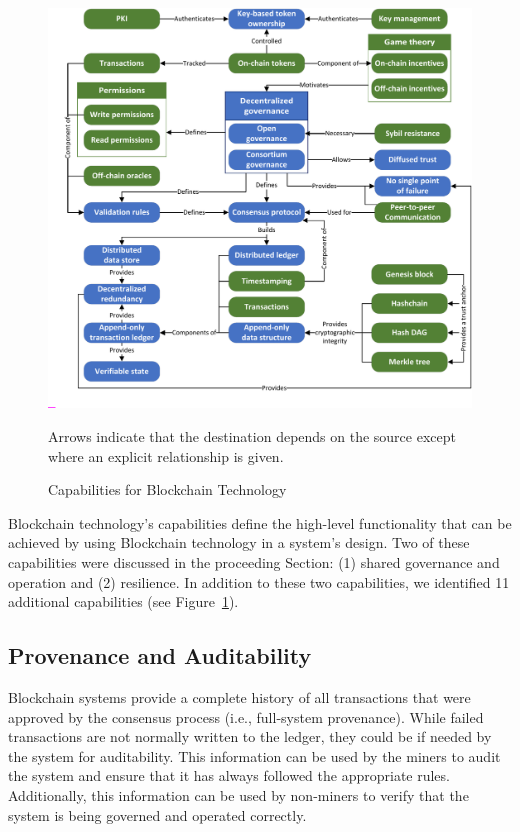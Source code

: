 \begin{figure}
	\centering
	\includegraphics[page=4,width=\columnwidth]{figures/grounded-theory-main}
	
	Arrows indicate that the destination depends on the source except where an explicit relationship is given.
	\caption{Capabilities for Blockchain Technology}
	\label{fig:Capabilities}
\end{figure}

Blockchain technology's capabilities define the high-level functionality that can be achieved by using Blockchain technology in a system's design.
Two of these capabilities were discussed in the proceeding Section: (1) shared governance and operation and (2) resilience.
In addition to these two capabilities, we identified 11 additional capabilities (see Figure~\ref{fig:Capabilities}).

\subsection{Provenance and Auditability}
Blockchain systems provide a complete history of all transactions that were approved by the consensus process (i.e., full-system provenance).
While failed transactions are not normally written to the ledger, they could be if needed by the system for auditability.
This information can be used by the miners to audit the system and ensure that it has always followed the appropriate rules.
Additionally, this information can be used by non-miners to verify that the system is being governed and operated correctly.

